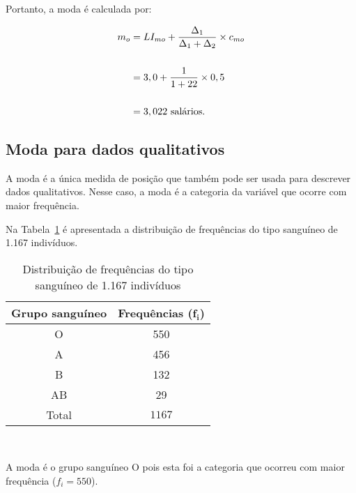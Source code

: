 \documentclass[11pt,fleqn]{book} %
\begin{document}
\begin{example}
Portanto, a moda é calculada por: 

\begin{ceqn}
\begin{align*}
\centering
m_o
&= LI_{mo}+\frac{\Delta_1}{\Delta_1+\Delta_2} \times c_{mo} \\ \\
&= 3,0+\frac{1}{1+22} \times 0,5 \\ \\
&= 3,022 \mbox{ salários}. 
\end{align*}
\end{ceqn}

\end{example}

\vspace{0,3cm}



\subsection{Moda para dados qualitativos}

A moda é a única medida de posição que também pode ser usada para descrever dados qualitativos. Nesse caso, a moda é a categoria da variável que ocorre com maior frequência. \\


\begin{example}

Na Tabela~\ref{tab:distdadosqualimoda} é apresentada a distribuição de frequências do tipo sanguíneo de 1.167 indivíduos. 

\begin{table}[h]
	\caption{Distribuição de frequências do tipo sanguíneo de 1.167 indivíduos}
	\label{tab:distdadosqualimoda} 
	\vspace{-0.1cm}
	\centering
	\begin{tabular}{c c}
	\toprule
	\textbf{Grupo sanguíneo} & \textbf{Frequências} ($\bm{f_i}$) \\
	\midrule
	O & 550 \\
	A & 456 \\
	B & 132 \\
	AB & 29 \\
	\hline
	Total & $1167$ \\
	\bottomrule
	\end{tabular} \\
\end{table}

A moda é o grupo sanguíneo O pois esta foi a categoria que ocorreu com maior frequência ($f_i=550$).


\end{example}
\end{document}
